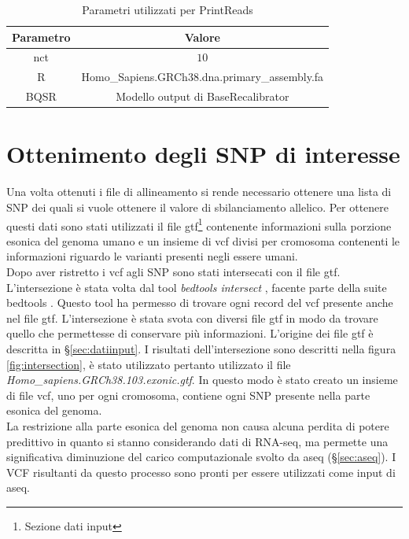     \begin{table}[H]
        \centering
        \begin{tabular}{|c|c|}
                \hline
                Parametro & Valore\\
                \hline
                nct & $10$\\
                \hline
                R & Homo\_Sapiens.GRCh38.dna.primary\_assembly.fa\\
                \hline
                BQSR & Modello output di BaseRecalibrator\\
                \hline
         \end{tabular}
         \caption{Parametri utilizzati per PrintReads}
    \end{table}


  \section{Ottenimento degli SNP di interesse}
  Una volta ottenuti i file di allineamento si rende necessario ottenere una lista di SNP dei quali si vuole ottenere il valore di sbilanciamento allelico.
  Per ottenere questi dati sono stati utilizzati il file gtf\footnote{Sezione dati input} contenente informazioni sulla porzione esonica del genoma umano e un insieme di vcf divisi per cromosoma contenenti le informazioni riguardo le varianti presenti negli essere umani.\\
  Dopo aver ristretto i vcf agli SNP sono stati intersecati con il file gtf.
  L'intersezione \`e stata volta dal tool \emph{bedtools intersect} \cite{bedtoolsintersect}, facente parte della suite bedtools \cite{bedtools}.
  Questo tool ha permesso di trovare ogni record del vcf presente anche nel file gtf.
  L'intersezione \`e stata svota con diversi file gtf in modo da trovare quello che permettesse di conservare pi\`u informazioni.
  L'origine dei file gtf \`e descritta in \S\ref{sec:datiinput}.
  I risultati dell'intersezione sono descritti nella figura \ref{fig:intersection}, \`e stato utilizzato pertanto utilizzato il file \emph{Homo\_sapiens.GRCh38.103.exonic.gtf}.
  In questo modo \`e stato creato un insieme di file vcf, uno per ogni cromosoma, contiene ogni SNP presente nella parte esonica del genoma.\\
  La restrizione alla parte esonica del genoma non causa alcuna perdita di potere predittivo in quanto si stanno considerando dati di RNA-seq, ma permette una significativa diminuzione del carico computazionale svolto da aseq (\S\ref{sec:aseq}).
  I VCF risultanti da questo processo sono pronti per essere utilizzati come input di aseq.

